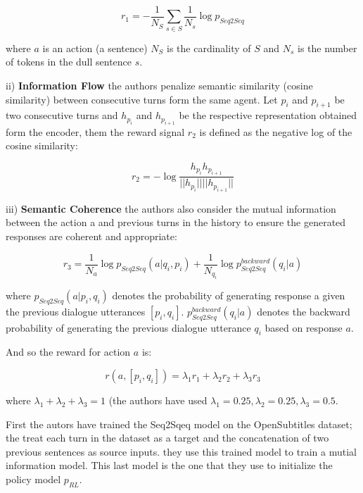 \begin{equation}
r_1 = - \frac{1}{N_{S}} \sum_{s\in S} \frac{1}{N_{s}} \log p_{Seq2Seq}
\end{equation}

where $a$ is an action (a sentence) $N_{S}$ is the cardinality of $S$ and $N_{s}$ is the number of tokens in the dull sentence $s$.

ii) \textbf{Information Flow} the authors penalize semantic similarity (cosine similarity) between consecutive turns form the same agent. Let $p_i$ and $p_{i+1}$ be two consecutive turns and $h_{p_{i}}$ and $h_{p_{i+1}}$ be the respective representation obtained form the encoder, them the reward signal $r_2$ is defined as the negative log of the cosine similarity:

\begin{equation}
r_2 = - \log \frac{h_{p_{i}} h_{p_{i+1}}}{||h_{p_{i}}|| ||h_{p_{i+1}}||}
\end{equation}


iii) \textbf{Semantic Coherence} the authors also consider the mutual information between the action a and previous turns in the history to ensure the generated
responses are coherent and appropriate:

\begin{equation}
r_3 = \frac{1}{N_{a}} \log p_{Seq2Seq}(a| q_i, p_i) + \frac{1}{N_{q_{i}}} \log p_{Seq2Seq}^{backward}(q_i| a)  
\end{equation}

where $p_{Seq2Seq}(a| p_i, q_i)$ denotes the probability of generating
response a given the previous dialogue utterances $[p_i, q_i]$. $p_{Seq2Seq}^{backward}(q_i| a)$ denotes the backward probability
of generating the previous dialogue utterance $q_i$ based on response $a$.

And so the reward for action $a$ is:

\begin{equation}
r(a, [p_i, q_i]) = \lambda_1 r_1 + \lambda_2 r_2 + \lambda_3 r_3
\end{equation}

where $\lambda_1 + \lambda_2 + \lambda_3 = 1$ (the authors have used $\lambda_1 = 0.25, \lambda_2 = 0.25, \lambda_3 = 0.5$.

\par First the autors have trained the Seq2Sqeq model on the OpenSubtitles dataset; the treat each turn in the dataset as a target and the concatenation of two previous sentences as source inputs. they use this trained model to train a mutial information model. This last model is the one that they use to initialize the policy model $p_{RL}$.

